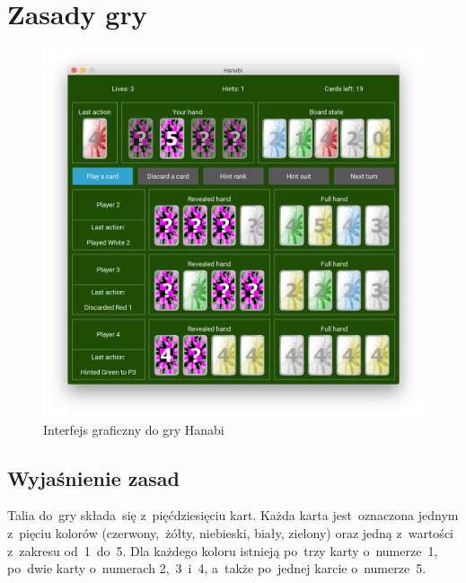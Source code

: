 \documentclass[declaration,shortabstract,inz]{iithesis}
\begin{document}
\chapter{Zasady gry}

\renewcommand{\thefigure}{1}
\begin{figure}[ht!]
	\centering
	\includegraphics[width=1.0\linewidth]{gui.png}
	\caption[Caption]{Interfejs graficzny do gry Hanabi}
\end{figure}

\newpage

\section{Wyjaśnienie zasad}

Talia do~gry składa~się z~pięćdziesięciu kart. Każda karta jest~oznaczona jednym z~pięciu kolorów (czerwony, żółty, niebieski, biały, zielony) oraz jedną z~wartości z~zakresu od~1~do~5. Dla każdego koloru istnieją po~trzy karty o~numerze~1, po~dwie karty o~numerach 2,~3~i~4, a~także po~jednej karcie o~numerze~5.
\end{document}
